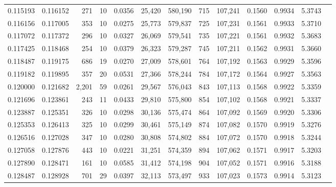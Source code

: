 \begin{tabular}{rrrrrrrrrrrrr}
0.115193 & 0.116152 &   271 &  10 &                                     0.0356 &  25,420 & 580,190 &     715 & 107,241 & 0.1560 & 0.9934 & 5.3743 \\
0.116156 & 0.117005 &   353 &  10 &                                     0.0275 &  25,773 & 579,837 &     725 & 107,231 & 0.1561 & 0.9933 & 5.3710 \\
0.117072 & 0.117372 &   296 &  10 &                                     0.0327 &  26,069 & 579,541 &     735 & 107,221 & 0.1561 & 0.9932 & 5.3683 \\
0.117425 & 0.118468 &   254 &  10 &                                     0.0379 &  26,323 & 579,287 &     745 & 107,211 & 0.1562 & 0.9931 & 5.3660 \\
0.118487 & 0.119175 &   686 &  19 &                                     0.0270 &  27,009 & 578,601 &     764 & 107,192 & 0.1563 & 0.9929 & 5.3596 \\
0.119182 & 0.119895 &   357 &  20 &                                     0.0531 &  27,366 & 578,244 &     784 & 107,172 & 0.1564 & 0.9927 & 5.3563 \\
0.120000 & 0.121682 & 2,201 &  59 &                                     0.0261 &  29,567 & 576,043 &     843 & 107,113 & 0.1568 & 0.9922 & 5.3359 \\
0.121696 & 0.123861 &   243 &  11 &                                     0.0433 &  29,810 & 575,800 &     854 & 107,102 & 0.1568 & 0.9921 & 5.3337 \\
0.123887 & 0.125351 &   326 &  10 &                                     0.0298 &  30,136 & 575,474 &     864 & 107,092 & 0.1569 & 0.9920 & 5.3306 \\
0.125353 & 0.126413 &   325 &  10 &                                     0.0299 &  30,461 & 575,149 &     874 & 107,082 & 0.1570 & 0.9919 & 5.3276 \\
0.126516 & 0.127028 &   347 &  10 &                                     0.0280 &  30,808 & 574,802 &     884 & 107,072 & 0.1570 & 0.9918 & 5.3244 \\
0.127058 & 0.127876 &   443 &  10 &                                     0.0221 &  31,251 & 574,359 &     894 & 107,062 & 0.1571 & 0.9917 & 5.3203 \\
0.127890 & 0.128471 &   161 &  10 &                                     0.0585 &  31,412 & 574,198 &     904 & 107,052 & 0.1571 & 0.9916 & 5.3188 \\
0.128487 & 0.128928 &   701 &  29 &                                     0.0397 &  32,113 & 573,497 &     933 & 107,023 & 0.1573 & 0.9914 & 5.3123 \\

\end{tabular}
